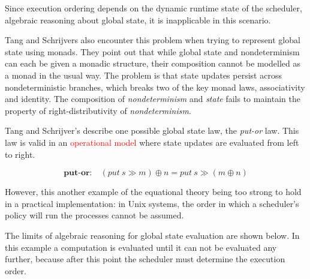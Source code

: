 \documentclass[logo,bsc,singlespacing,parskip]{infthesis}
\begin{document}
Since execution ordering depends on the dynamic runtime state of the scheduler, algebraic reasoning about global state, it is inapplicable in this scenario. 

Tang and Schrijvers also encounter this problem when trying to represent global state using monads. They point out that while global state and nondeterminism can each be given a monadic structure, their composition cannot be modelled as a monad in the usual way. The problem is that state updates persist across nondeterministic branches, which breaks two of the key monad laws, associativity and identity. The composition of \textit{nondeterminism} and \textit{state} fails to maintain the property of right-distributivity of \textit{nondeterminism}.


Tang and Schrijver's describe one possible global state law,  the \textit{put-or} law. This law is valid in an \textcolor{red}{operational model} where state updates are evaluated from left to right.

\[
\textbf{put-or:} \quad (put\ s \gg m) \oplus n = put\ s \gg (m \oplus n) 
\]

However, this another example of the equational theory being too strong to hold in a practical implementation: in Unix systems, the order in which a scheduler's policy will run the processes cannot be assumed.


The limits of algebraic reasoning for global state evaluation are shown below. In this example a computation is evaluated until it can not be evaluated any further, because after this point the scheduler must determine the execution order.
\end{document}
